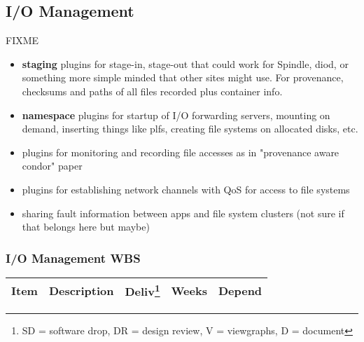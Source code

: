 \subsection{I/O Management}

FIXME

\begin{itemize}
\item{\textbf{staging} plugins for stage-in, stage-out that could work
for Spindle, diod, or something more simple minded that other sites might use.
For provenance, checksums and paths of all files recorded plus container info.}
\item{\textbf{namespace} plugins for startup of I/O forwarding servers,
mounting on demand, inserting things like plfs, creating file systems on
allocated disks, etc.}
\item{plugins for monitoring and recording file accesses as in "provenance
  aware condor" paper}
\item{plugins for establishing network channels with QoS for access to file
systems}
\item{sharing fault information between apps and file system clusters
  (not sure if that belongs here but maybe)}
\end{itemize}

\ifwbs
\subsubsection{I/O Management WBS}

\begin{longtable}{|p{1cm}|p{10.2cm}|p{1cm}|p{1cm}|p{1.8cm}|}\hline
  \textbf{Item} & \textbf{Description}
                & \textbf{Deliv}\footnote{SD = software drop,
                        DR = design review, V = viewgraphs, D = document}
                & \textbf{Weeks} & \textbf{Depend} \\
  \hline
\end{longtable}
\fi
